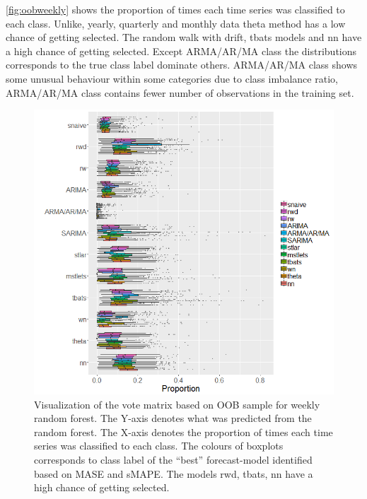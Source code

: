 \documentclass[11pt,a4paper,]{article}
\begin{document}
\autoref{fig:oobweekly} shows the proportion of times each time series
was classified to each class. Unlike, yearly, quarterly and monthly data
theta method has a low chance of getting selected. The random walk with
drift, tbats models and nn have a high chance of getting selected.
Except ARMA/AR/MA class the distributions corresponds to the true class
label dominate others. ARMA/AR/MA class shows some unusual behaviour
within some categories due to class imbalance ratio, ARMA/AR/MA class
contains fewer number of observations in the training set.

\begin{figure}
\centering
\includegraphics{figures/oobweekly-1.png}
\caption{\label{fig:oobweekly}Visualization of the vote matrix based on OOB
sample for weekly random forest. The Y-axis denotes what was predicted
from the random forest. The X-axis denotes the proportion of times each
time series was classified to each class. The colours of boxplots
corresponds to class label of the ``best'' forecast-model identified
based on MASE and sMAPE. The models rwd, tbats, nn have a high chance of
getting selected.}
\end{figure}

\clearpage
\end{document}
